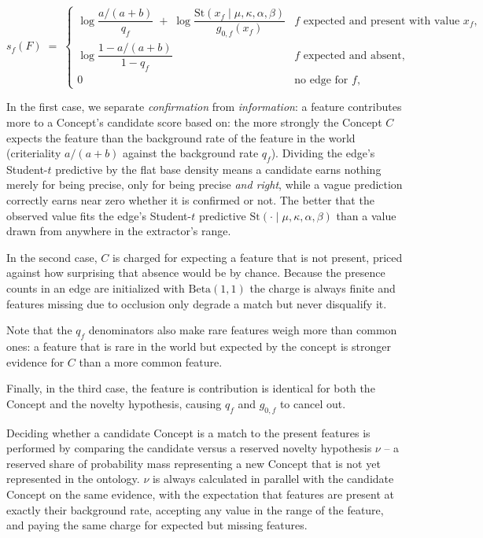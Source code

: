 \documentclass{article}
\begin{document}
$$
s_f(F) \;=\;
\begin{cases}
\log\dfrac{a/(a+b)}{q_f} \;+\; \log\dfrac{\mathrm{St}\!\left(x_f \mid \mu,\kappa,\alpha,\beta\right)}{g_{0,f}(x_f)} & \text{$f$ expected and present with value $x_f$,}\\[10pt]
\log\dfrac{1 - a/(a+b)}{1 - q_f} & \text{$f$ expected and absent,}\\[10pt]
0 & \text{no edge for $f$,}
\end{cases}
$$

In the first case, we separate \emph{confirmation} from \emph{information}: a feature contributes more to a Concept's candidate score based on: the more strongly the Concept $C$ expects the feature than the background rate of the feature in the world (criteriality $a/(a+b)$ against the background rate $q_f$). Dividing the edge's Student-$t$ predictive by the flat base density means a candidate earns nothing merely for being precise, only for being precise \emph{and right}, while a vague prediction correctly earns near zero whether it is confirmed or not. The better that the observed value fits the edge's Student-$t$ predictive $\mathrm{St}(\cdot \mid \mu,\kappa,\alpha,\beta)$ than a value drawn from anywhere in the extractor's range.

In the second case, $C$ is charged for expecting a feature that is not present, priced against how surprising that absence would be by chance. Because the presence counts in an edge are initialized with $\mathrm{Beta}(1,1)$ the charge is always finite and features missing due to occlusion only degrade a match but never disqualify it.

Note that the $q_f$ denominators also make rare features weigh more than common ones: a feature that is rare in the world but expected by the concept is stronger evidence for $C$ than a more common feature.

Finally, in the third case, the feature is contribution is identical for both the Concept and the novelty hypothesis, causing $q_f$ and $g_{0,f}$ to cancel out.

Deciding whether a candidate Concept is a match to the present features is performed by comparing the candidate versus a reserved novelty hypothesis $\nu$ -- a reserved share of probability mass representing a new Concept that is not yet represented in the ontology. $\nu$ is always calculated in parallel with the candidate Concept on the same evidence, with the expectation that features are present at exactly their background rate, accepting any value in the range of the feature, and paying the same charge for expected but missing features.
\end{document}
